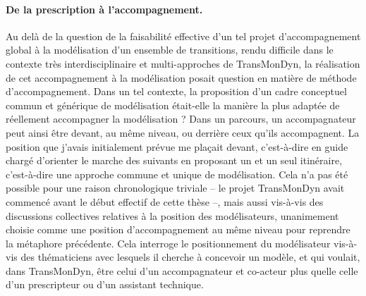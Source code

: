 \paragraph{De la prescription à l'accompagnement.}

Au delà de la question de la faisabilité effective d'un tel projet d'accompagnement global à la modélisation d'un ensemble de transitions, rendu difficile dans le contexte très interdisciplinaire et multi-approches de TransMonDyn, la réalisation de cet \og accompagnement à la modélisation\fg{} posait question en matière de méthode d'accompagnement.
Dans un tel contexte, la proposition d'un cadre conceptuel commun et générique de modélisation était-elle la manière la plus adaptée de réellement \og accompagner\fg{} la modélisation ?
Dans un parcours, un accompagnateur peut ainsi être devant, au même niveau, ou derrière ceux qu'ils accompagnent.
La position que j'avais initialement prévue me plaçait \og devant\fg{}, c'est-à-dire en guide chargé d'orienter le marche des suivants en proposant un et un seul itinéraire, c'est-à-dire une approche commune et unique de modélisation.
Cela n'a pas été possible pour une raison chronologique triviale -- le projet TransMonDyn avait commencé avant le début effectif de cette thèse --, mais aussi vis-à-vis des discussions collectives relatives à la position des modélisateurs, unanimement choisie comme une position d'accompagnement \og au même niveau\fg{} pour reprendre la métaphore précédente.
Cela interroge le positionnement du modélisateur vis-à-vis des thématiciens \og avec\fg{} lesquels il cherche à concevoir un modèle, et qui voulait, dans TransMonDyn, être celui d'un \og accompagnateur\fg{} et co-acteur plus quelle celle d'un prescripteur ou d'un assistant technique.


